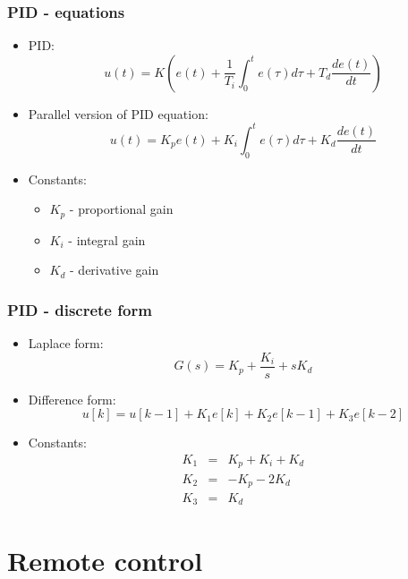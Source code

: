 \documentclass{beamer}
\begin{document}
\begin{frame}
\frametitle{PID - equations}

\begin{itemize}
    \item PID:
        $$u(t) = K \left( e(t) + \frac{1}{T_i} \int_0^t e(\tau)d\tau + T_d
        \frac{de(t)}{dt} \right)$$
    \item Parallel version of PID equation:
        $$u(t) =  K_pe(t) + K_i \int_0^t e(\tau)d\tau + K_d \frac{de(t)}{dt}$$
    \pause \item Constants:
    \begin{itemize}
        \item $K_p$ - proportional gain
        \item $K_i$ - integral gain
        \item $K_d$ - derivative gain
    \end{itemize}
\end{itemize}

\end{frame}

\begin{frame}
\frametitle{PID - discrete form}

\begin{itemize}
    \item Laplace form:
        $$G(s) = K_p + \frac{K_i}{s} + sK_d$$
    \pause \item Difference form:
        $$u[k] = u[k-1] + K_1e[k]+K_2e[k-1]+K_3e[k-2]$$

    \item Constants:
        \begin{eqnarray*}
            K_1 &=& K_p + K_i + K_d \\
            K_2 &=& -K_p-2K_d \\
            K_3 &=& K_d
        \end{eqnarray*}

\end{itemize}

\end{frame}

\section{Remote control}
\end{document}

